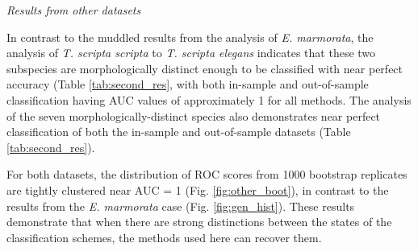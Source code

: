 \documentclass[12pt,letterpaper]{article}
\renewcommand{\subsection}[1]{%
\bigskip
\begin{center}
\begin{large}
\normalfont\itshape #1
\end{large}
\end{center}}
\begin{document}
\clearpage
\subsection{Results from other datasets}

In contrast to the muddled results from the analysis of \textit{E. marmorata}, the analysis of \textit{T. scripta scripta} to \textit{T. scripta elegans} indicates that these two subspecies are morphologically distinct enough to be classified with near perfect accuracy (Table \ref{tab:second_res}, with both in-sample and out-of-sample classification having AUC values of approximately 1 for all methods. The analysis of the seven morphologically-distinct species also demonstrates near perfect classification of both the in-sample and out-of-sample datasets (Table \ref{tab:second_res}). 

For both datasets, the distribution of ROC scores from 1000 bootstrap replicates are tightly clustered near AUC = 1 (Fig. \ref{fig:other_boot}), in contrast to the results from the \textit{E. marmorata} case (Fig. \ref{fig:gen_hist}). These results demonstrate that when there are strong distinctions between the states of the classification schemes, the methods used here can recover them.
\end{document}
